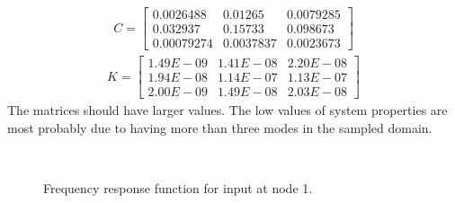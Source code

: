 \documentclass[paper=a4, fontsize=12pt]{scrartcl} %
\begin{document}
%
%
\begin{gather*}
C = 
\begin{bmatrix}
	0.0026488 & 0.01265 & 0.0079285 \\
	0.032937 & 0.15733 & 0.098673 \\
	0.00079274 & 0.0037837 & 0.0023673
\end{bmatrix}
\end{gather*}
%
%
\begin{gather*}
K = 
\begin{bmatrix}
	1.49E-09 & 1.41E-08 & 2.20E-08 \\
	1.94E-08 & 1.14E-07 & 1.13E-07 \\
	2.00E-09 & 1.49E-08 & 2.03E-08
\end{bmatrix}
\end{gather*}
%
The matrices should have larger values. The low values of system properties are most probably due to having more than three modes in the sampled domain.
%
\begin{figure}[H]
	\centering
	\quad
	\\
	\caption{Frequency response function for input at node 1.}
	\label{fig:all_FRFs_1}
\end{figure}
\end{document}
